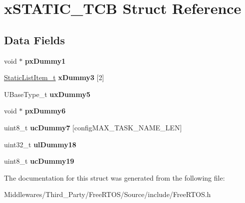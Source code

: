 \hypertarget{structx_s_t_a_t_i_c___t_c_b}{}\section{x\+S\+T\+A\+T\+I\+C\+\_\+\+T\+CB Struct Reference}
\label{structx_s_t_a_t_i_c___t_c_b}
\subsection*{Data Fields}
\begin{DoxyCompactItemize}
\item 
\mbox{\label{structx_s_t_a_t_i_c___t_c_b_ae84725165c0efa82ef99b557ae6441a3}} 
void $\ast$ {\bfseries px\+Dummy1}
\item 
\mbox{\label{structx_s_t_a_t_i_c___t_c_b_acbd968fbd6059e44009bb84bbc25cb1d}} 
\mbox{\hyperlink{structx_s_t_a_t_i_c___l_i_s_t___i_t_e_m}{Static\+List\+Item\+\_\+t}} {\bfseries x\+Dummy3} \mbox{[}2\mbox{]}
\item 
\mbox{\label{structx_s_t_a_t_i_c___t_c_b_a0e266307381fece384ea3b4499e69b6f}} 
U\+Base\+Type\+\_\+t {\bfseries ux\+Dummy5}
\item 
\mbox{\label{structx_s_t_a_t_i_c___t_c_b_a76f9c413ec3b5c20c11afc867e5ed80e}} 
void $\ast$ {\bfseries px\+Dummy6}
\item 
\mbox{\label{structx_s_t_a_t_i_c___t_c_b_a53b726dadeaf28e49ae7c264d61cfc1d}} 
uint8\+\_\+t {\bfseries uc\+Dummy7} \mbox{[}config\+M\+A\+X\+\_\+\+T\+A\+S\+K\+\_\+\+N\+A\+M\+E\+\_\+\+L\+EN\mbox{]}
\item 
\mbox{\label{structx_s_t_a_t_i_c___t_c_b_a1ed5081a5e856f7e9a91cb576e392a04}} 
uint32\+\_\+t {\bfseries ul\+Dummy18}
\item 
\mbox{\label{structx_s_t_a_t_i_c___t_c_b_a5140e0e79dcb02a51011a1aa4ef58876}} 
uint8\+\_\+t {\bfseries uc\+Dummy19}
\end{DoxyCompactItemize}


The documentation for this struct was generated from the following file\+:\begin{DoxyCompactItemize}
\item 
Middlewares/\+Third\+\_\+\+Party/\+Free\+R\+T\+O\+S/\+Source/include/Free\+R\+T\+O\+S.\+h\end{DoxyCompactItemize}
